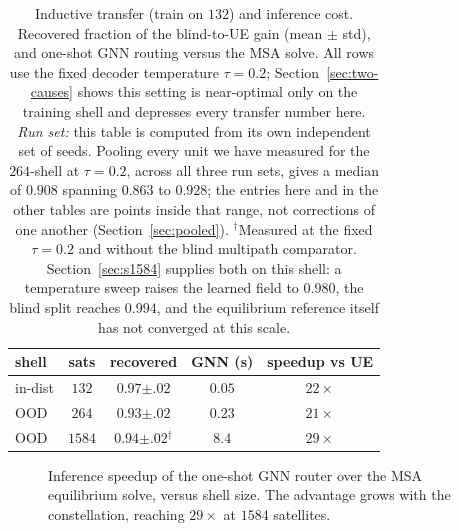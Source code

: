\documentclass[journal]{IEEEtran}
\begin{document}
\begin{table}[t]
\centering\footnotesize\setlength{\tabcolsep}{3pt}
\caption{Inductive transfer (train on $132$) and inference cost. Recovered fraction of
the blind-to-UE gain (mean $\pm$ std), and one-shot GNN routing versus the MSA solve. All rows use the fixed decoder temperature $\tau=0.2$; Section~\ref{sec:two-causes} shows this setting is near-optimal only on the training shell and depresses every transfer number here. \emph{Run set:} this table is computed from its own independent set of seeds. Pooling every unit we have measured for the $264$-shell at $\tau=0.2$, across all three run sets, gives a median of $0.908$ spanning $0.863$ to $0.928$; the entries here and in the other tables are points inside that range, not corrections of one another (Section~\ref{sec:pooled}). $^{\dagger}$Measured at the fixed $\tau=0.2$ and without the blind multipath comparator. Section~\ref{sec:s1584} supplies both on this shell: a temperature sweep raises the learned field to $0.980$, the blind split reaches $0.994$, and the equilibrium reference itself has not converged at this scale.}
\label{tab:scale}
\begin{tabular}{lcccc}
\toprule
shell & sats & recovered & GNN (s) & speedup vs UE \\
\midrule
in-dist & $132$ & $0.97{\scriptstyle\pm.02}$ & $0.05$ & $22\times$ \\
OOD & $264$ & $0.93{\scriptstyle\pm.02}$ & $0.23$ & $21\times$ \\
OOD & $1584$ & $0.94{\scriptstyle\pm.02}$$^{\dagger}$ & $8.4$ & $29\times$ \\
\bottomrule
\end{tabular}
\end{table}

\begin{figure}[t]
\centering
{}
\caption{Inference speedup of the one-shot GNN router over the MSA equilibrium solve,
versus shell size. The advantage grows with the constellation, reaching $29\times$ at
$1584$ satellites.}
\label{fig:speedup}
\end{figure}
\end{document}
